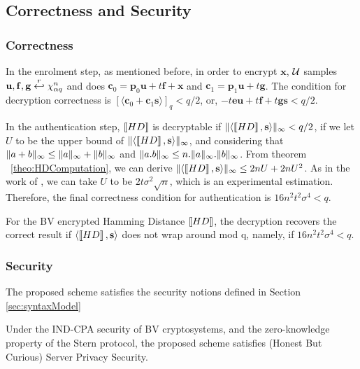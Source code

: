\subsection{Correctness and Security}
\label{sec:protocol1CorrectnessSecurity}

\subsubsection{Correctness}
\label{sec:correctness}
In the enrolment step, as mentioned before, in order to encrypt $\mathbf{x}$,
$\mathcal{U}$ samples $\mathbf{u,f,g} \stackrel{r}{\hookleftarrow} \chi_{\alpha q}^n$ and does
$\mathbf{c}_0 = \mathbf{p}_0\mathbf{u} + t\mathbf{f} + \mathbf{x}$ and
$\mathbf{c}_1 = \mathbf{p}_1\mathbf{u} + t\mathbf{g}$. The condition for decryption
correctness is $[\langle \mathbf{c}_0 + \mathbf{c}_1\mathbf{s} \rangle]_q < q/2$, or,
$-t\mathbf{eu} + t\mathbf{f} + t\mathbf{gs} < q/2$.

In the authentication step, \(\left\llbracket HD\right\rrbracket\) is decryptable if
\(\Vert \langle \left\llbracket HD\right\rrbracket, \mathbf{s} \rangle \Vert_{\infty} < q/2\), if we let \(U\) to be
the upper bound of \(\Vert \langle \left\llbracket HD\right\rrbracket, \mathbf{s} \rangle \Vert_{\infty}\), and
considering that \(\Vert a + b \Vert_{\infty} \leq \Vert a \Vert_{\infty} + \Vert b \Vert_{\infty}\) and
\(\Vert a.b \Vert_{\infty} \leq n.\Vert a \Vert_{\infty}.\Vert b \Vert_{\infty}\). From theorem
~\ref{theo:HDComputation}, we can derive
\(\Vert \langle \left\llbracket HD\right\rrbracket,\mathbf{s} \rangle \Vert_{\infty} \leq 2nU + 2nU^{2}\). As in the
work of \cite{naehrig2011can}, we can take \(U\) to be
\(2t \sigma^{2} \sqrt{n}\), which is an experimental estimation. Therefore, the
final correctness condition for authentication is
\( 16n^{2}t^{2}\sigma^{4} < q\).
\begin{lemma}
  \label{le:hdcorrectness}
 For the BV encrypted Hamming Distance \(\left\llbracket HD\right\rrbracket\), the decryption recovers the correct result if \(\langle \left\llbracket HD\right\rrbracket,
 \mathbf{s} \rangle\) does not wrap around mod q, namely, if \(16n^{2}t^{2}\sigma^{4} < q\).
\end{lemma}

\subsubsection{Security}
\label{sec:securityPro1}
The proposed scheme satisfies the security notions defined in Section \ref{sec:syntaxModel}
\begin{theorem}
  \label{theo:serverPro1}
  Under the IND-CPA security of BV cryptosystems, and the zero-knowledge property of the Stern protocol, the proposed
  scheme satisfies (Honest But Curious) Server Privacy Security.
\end{theorem}


